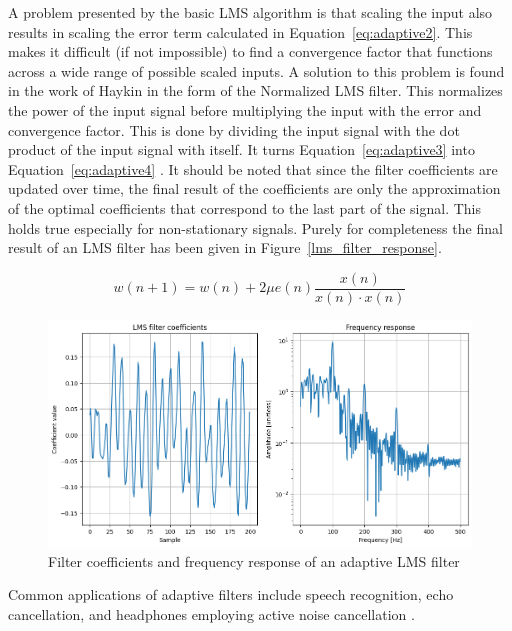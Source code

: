 A problem presented by the basic LMS algorithm is that scaling the input also results in scaling the error term calculated in Equation~\ref{eq:adaptive2}. This makes it difficult (if not impossible) to find a convergence factor that functions across a wide range of possible scaled inputs. A solution to this problem is found in the work of Haykin \cite{adaptive_filter_theory} in the form of the Normalized LMS filter. This normalizes the power of the input signal before multiplying the input with the error and convergence factor. This is done by dividing the input signal with the  dot product of the input signal with itself. It turns Equation~\ref{eq:adaptive3} into Equation~\ref{eq:adaptive4} \cite{adaptive_filter_theory}. It should be noted that since the filter coefficients are updated over time, the final result of the coefficients are only the approximation of the optimal coefficients that correspond to the last part of the signal. This holds true especially for non-stationary signals. Purely for completeness the final result of an LMS filter has been given in Figure~\ref{lms_filter_response}.

\begin{equation}\label{eq:adaptive4}
    w(n+1) = w(n) + 2 \mu e(n)  \frac{x(n)}{x(n) \cdot x(n)}
\end{equation}

\begin{figure}[h!t]
	\begin{center}
		\includegraphics[width=1.0\columnwidth]{images/lms_filter_response.png}
	\end{center}
	\caption{Filter coefficients and frequency response of an adaptive LMS filter}
	\label{fig:lms_filter_response}
\end{figure}

Common applications of adaptive filters include speech recognition, echo cancellation, and headphones employing active noise cancellation \cite{active_noise_cancellation_wiener_filter,wiener_vs_adaptive_realtime_noisecancellation}.

